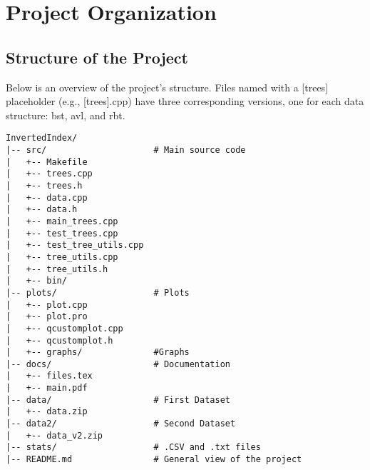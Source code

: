 \section{Project Organization}

\subsection{Structure of the Project}
Below is an overview of the project's structure. Files named with a [trees] placeholder (e.g., [trees].cpp) have three corresponding versions, one for each data structure: bst, avl, and rbt.


\begin{verbatim}
InvertedIndex/
|-- src/                     # Main source code
|   +-- Makefile          
|   +-- trees.cpp          
|   +-- trees.h 
|   +-- data.cpp
|   +-- data.h 
|   +-- main_trees.cpp 
|   +-- test_trees.cpp 
|   +-- test_tree_utils.cpp 
|   +-- tree_utils.cpp 
|   +-- tree_utils.h 
|   +-- bin/
|-- plots/                   # Plots
|   +-- plot.cpp
|   +-- plot.pro
|   +-- qcustomplot.cpp
|   +-- qcustomplot.h
|   +-- graphs/              #Graphs
|-- docs/                    # Documentation
|   +-- files.tex
|   +-- main.pdf
|-- data/                    # First Dataset
|   +-- data.zip
|-- data2/                   # Second Dataset
|   +-- data_v2.zip                        
|-- stats/                   # .CSV and .txt files 
|-- README.md                # General view of the project
\end{verbatim}